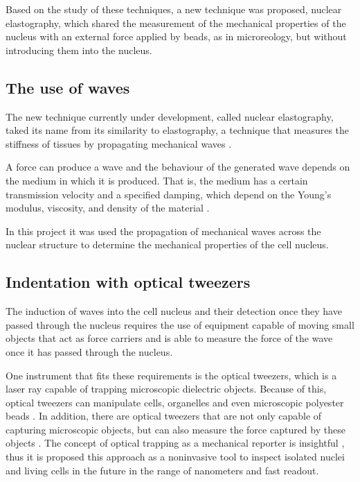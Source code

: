 \documentclass[12pt, a4paper]{article} %
\begin{document}
	Based on the study of these techniques, a new technique was proposed, nuclear elastography, which shared the measurement of the mechanical properties of the nucleus with an external force applied by beads, as in microreology, but without introducing them into the nucleus. 
	
	\setlength{\parskip}{0mm}
	
	\subsection{The use of waves}
	
	The new technique currently under development, called nuclear elastography, taked its name from its similarity to elastography, a technique that measures the stiffness of tissues by propagating mechanical waves \cite{gennisson2013ultrasound}. 
	
	\setlength{\parskip}{4mm}
	
	A force can produce a wave and the behaviour of the generated wave depends on the medium in which it is produced. That is, the medium has a certain transmission velocity and a specified damping, which depend on the Young's modulus, viscosity, and density of the material \cite{achenbach2012wave}. 
	
	In this project it was used the propagation of mechanical waves across the nuclear structure to determine the mechanical properties of the cell nucleus.
	
	\setlength{\parskip}{0mm}
	
	\subsection{Indentation with optical tweezers}
	
	The induction of waves into the cell nucleus and their detection once they have passed through the nucleus requires the use of equipment capable of moving small objects that act as force carriers and is able to measure the force of the wave once it has passed through the nucleus. 
	
	\setlength{\parskip}{4mm}
	
	One instrument that fits these requirements is the optical tweezers, which is a laser ray capable of trapping microscopic dielectric objects. Because of this, optical tweezers can manipulate cells, organelles and even microscopic polyester beads \cite{novotny1997theory, ombid2020vitro, ashkin1992forces}. In addition, there are optical tweezers that are not only capable of capturing microscopic objects, but can also measure the force captured by these objects \cite{farre2014force}. The concept of optical trapping as a mechanical reporter is insightful \cite{ashkin20182018}, thus it is proposed this approach as a noninvasive tool to inspect isolated nuclei and living cells in the future in the range of nanometers and fast readout.
	
\end{document}
